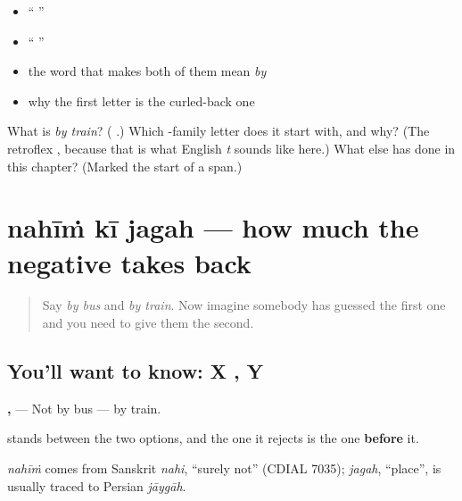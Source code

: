 \begin{itemize}
\raggedright
  \item \textquotedblleft{} \textquotedblright{}
  \item \textquotedblleft{} \textquotedblright{}
  \item the word that makes both of them mean \emph{by}
  \item why the first letter is the curled-back one
\end{itemize}

\begin{tcolorbox}[breakable,colback=teal!4,colframe=teal!35!black,title={Before you move on}]
What is \emph{by train}? (\textbf{ }.) Which \textbf{}-family letter does it start with, and why? (The retroflex \textbf{}, because that is what English \emph{t} sounds like here.) What else has \textbf{} done in this chapter? (Marked the start of a span.)
\end{tcolorbox}
\section[\texorpdfstring{\hi{नहीं} \hi{की} \hi{जगह} (nahīṁ kī jagah)}{नहीं की जगह (nahīṁ kī jagah)}]{nahīṁ kī jagah — how much the negative takes back}

\label{lesson:HI-C94-se-nahin}



\begin{quote}
Say \emph{by bus} and \emph{by train}. Now imagine somebody has guessed the first one and you need to give them the second.
\end{quote}

\subsection*{You'll want to know: X  , Y }
\textbf{  ,  } — Not by bus — by train.

\textbf{} stands between the two options, and the one it rejects is the one \textbf{before} it.

\begin{cousinweb}
\emph{nahīṁ} comes from Sanskrit \emph{nahi}, \textquotedblleft{}surely not\textquotedblright{} (CDIAL 7035); \emph{jagah}, \textquotedblleft{}place\textquotedblright{}, is usually traced to Persian \emph{jāygāh}.
\end{cousinweb}

